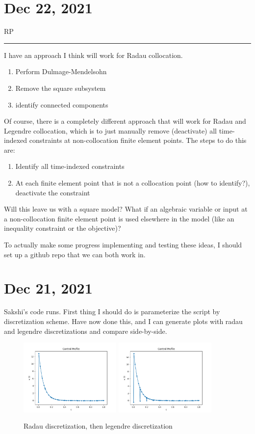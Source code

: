 \documentclass{article}
\newcommand{\RP}{RP\vspace{0.1cm}\hrule\vspace{0.2cm}}
\begin{document}
\section{Dec 22, 2021}
\RP
I have an approach I think will work for Radau collocation.
\begin{enumerate}
  \item Perform Dulmage-Mendelsohn
  \item Remove the square subsystem
  \item identify connected components
\end{enumerate}
Of course, there is a completely different approach that will work
for Radau and Legendre collocation, which is to just manually remove
(deactivate) all time-indexed constraints at non-collocation finite
element points.
The steps to do this are:
\begin{enumerate}
  \item Identify all time-indexed constraints
  \item At each finite element point that is not a collocation point
    (how to identify?), deactivate the constraint
\end{enumerate}
Will this leave us with a square model? What if an algebraic variable or
input at a non-collocation finite element point is used elsewhere in the
model (like an inequality constraint or the objective)?

\medskip

To actually make some progress implementing and testing these ideas, I should
set up a github repo that we can both work in.

\section{Dec 21, 2021}

Sakshi's code runs. First thing I should do is parameterize the script
by discretization scheme. Have now done this, and I can generate plots with
radau and legendre discretizations and compare side-by-side.

\begin{figure}[!h]
  \centering
  \includegraphics[width=5cm]{radau_control_profile.png}
  \includegraphics[width=5cm]{legendre_control_profile.png}
  \caption{Radau discretization, then legendre discretization}
\end{figure}
\end{document}
